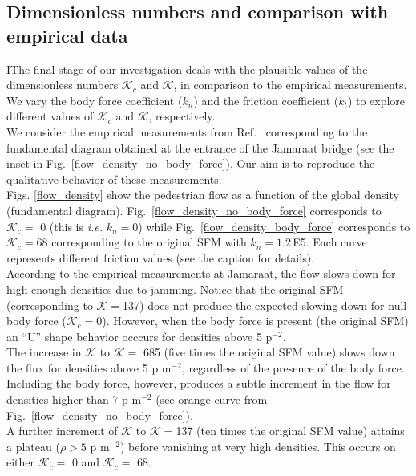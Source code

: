 \documentclass[preprint,12pt]{elsarticle}
\begin{document}
\subsection{Dimensionless numbers and comparison with empirical data}


IThe final stage of our investigation deals with the plausible values of the dimensionless numbers $\mathcal{K}_c$ and $\mathcal{K}$, in comparison to the empirical measurements. We vary the body force coefficient ($k_n$) and the friction coefficient ($k_t$) to explore different values of $\mathcal{K}_c$ and $\mathcal{K}$, respectively.\\

We consider the empirical measurements from Ref.~\cite{helbing_2007} corresponding to the fundamental diagram obtained at the entrance of the Jamaraat bridge (see the inset in Fig.~\ref{flow_density_no_body_force}). Our aim is to reproduce the qualitative behavior of these measurements.\\

Figs. \ref{flow_density} show the pedestrian flow as a function of the global density (fundamental diagram). Fig.~\ref{flow_density_no_body_force} corresponds to $\mathcal{K}_c=$ 0 (this is \textit{i.e.} $k_n=0$) while Fig.~\ref{flow_density_body_force} corresponds to $\mathcal{K}_c=$68 corresponding to the original SFM with $k_n=1.2\,$E5. Each curve represents different friction values (see the caption for details).\\

According to the empirical measurements at Jamaraat, the flow slows down for high enough densities due to jamming. Notice that the original SFM (corresponding to $\mathcal{K}=$137) does not produce the expected slowing down for null body force ($\mathcal{K}_c=$0). However, when the body force is present (the original SFM) an ``U'' shape behavior occcurs for densities above 5 p$^{-2}$.\\

The increase in $\mathcal{K}$ to $\mathcal{K} = $ 685 (five times the original SFM value) slows down  the flux for densities above 5 p m$^{-2}$, regardless of the presence of the body force. Including the body force, however, produces a subtle increment in the flow for densities higher than 7 p m$^{-2}$ (see orange curve from Fig.~\ref{flow_density_no_body_force}). \\

A further increment of $\mathcal{K}$ to $\mathcal{K}=$137 (ten times the original SFM value) attains a plateau ($\rho>5$ p m$^{-2}$) before vanishing at very high densities. This occurs on either $\mathcal{K}_c=$ 0 and $\mathcal{K}_c = $ 68.\\
\end{document}
